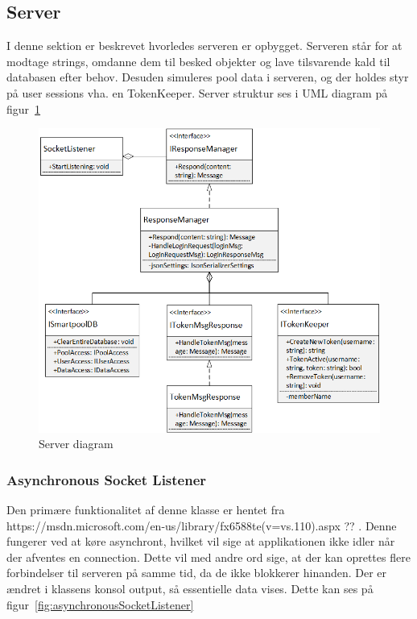 \subsection{Server}
I denne sektion er beskrevet hvorledes serveren er opbygget. Serveren står for at modtage strings, omdanne dem til besked objekter og lave tilsvarende kald til databasen efter behov. Desuden simuleres pool data i serveren, og der holdes styr på user sessions vha. en TokenKeeper. Server struktur ses i UML diagram på figur~\ref{fig:Connection.Server}

\begin{figure}
	\centering
	\includegraphics[width=0.9\linewidth]{figs/connection/Connection.Server.png}
	\caption{Server diagram}
	\label{fig:Connection.Server}
\end{figure}

\subsubsection{Asynchronous Socket Listener}
Den primære funktionalitet af denne klasse er hentet fra https://msdn.microsoft.com/en-us/library/fx6588te(v=vs.110).aspx ?? . Denne fungerer ved at køre asynchront, hvilket vil sige at applikationen ikke idler når der afventes en connection. Dette vil med andre ord sige, at der kan oprettes flere forbindelser til serveren på samme tid, da de ikke blokkerer hinanden.
Der er ændret i klassens konsol output, så essentielle data vises. Dette kan ses på figur~\ref{fig:asynchronousSocketListener}

